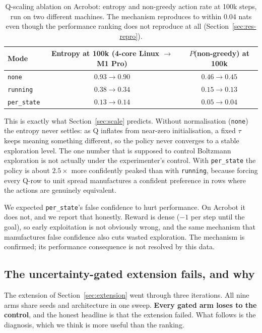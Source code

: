 \documentclass[11pt,a4paper]{article}
\begin{document}
\begin{table}[h]
\centering
\small
\caption{Q-scaling ablation on Acrobot: entropy and non-greedy action rate at
100k steps, run on two different machines. The mechanism reproduces to within
$0.04$ nats even though the performance ranking does not reproduce at all
(Section~\ref{sec:res-repro}).}
\label{tab:ablation}
\begin{tabular}{lcc}
\toprule
Mode & Entropy at 100k (4-core Linux $\to$ M1 Pro) & $P$(non-greedy) at 100k \\
\midrule
\texttt{none} & $0.93 \to \mathbf{0.90}$ & $0.46 \to \mathbf{0.45}$ \\
\texttt{running} & $0.38 \to \mathbf{0.34}$ & $0.15 \to \mathbf{0.13}$ \\
\texttt{per\_state} & $0.13 \to \mathbf{0.14}$ & $0.05 \to \mathbf{0.04}$ \\
\bottomrule
\end{tabular}
\end{table}

This is exactly what Section~\ref{sec:scale} predicts. Without normalisation
(\texttt{none}) the entropy never settles: as Q inflates from near-zero
initialisation, a fixed $\tau$ keeps meaning something different, so the policy
never converges to a stable exploration level. The one number that is supposed
to control Boltzmann exploration is not actually under the experimenter's
control. With \texttt{per\_state} the policy is about $2.5\times$ more
confidently peaked than with \texttt{running}, because forcing every Q-row to
unit spread manufactures a confident preference in rows where the actions are
genuinely equivalent.

We expected \texttt{per\_state}'s false confidence to hurt performance. On
Acrobot it does not, and we report that honestly. Reward is dense ($-1$ per
step until the goal), so early exploitation is not obviously wrong, and the
same mechanism that manufactures false confidence also cuts wasted
exploration. The mechanism is confirmed; its performance consequence is not
resolved by this data.

\subsection{The uncertainty-gated extension fails, and why}
\label{sec:res-uncertainty}

The extension of Section~\ref{sec:extension} went through three iterations. All
nine arms share seeds and architecture in one sweep. \textbf{Every gated arm
loses to the control}, and the honest headline is that the extension failed.
What follows is the diagnosis, which we think is more useful than the ranking.
\end{document}
